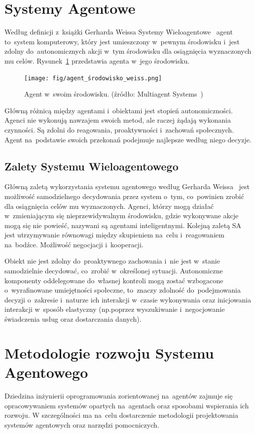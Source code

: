 \documentclass[11pt]{report}
\begin{document}
    \section{Systemy Agentowe}\label{sec:systemy-agentowe}
    Według definicji z~książki Gerharda Weissa Systemy Wieloagentowe~\cite{55066420130101} agent to~system komputerowy, który jest umieszczony w~pewnym środowisku i~jest zdolny do~autonomicznych akcji w~tym środowisku dla osiągnięcia wyznaczonych mu celów.
    Rysunek~\ref{fig:agent} przedstawia agenta w~jego środowisku.

    \begin{figure}[tp]
        \centering
        \texttt{[image: fig/agent\_środowisko\_weiss.png]}
        \caption{Agent w~swoim środowisku. (źródło: Multiagent Systems~\cite{55066420130101})}
        \label{fig:agent}
    \end{figure}

    Główną różnicą między agentami i~obiektami jest stopień autonomiczności.
    Agenci nie wykonują nawzajem swoich metod, ale raczej żądają wykonania czynności.
    Są zdolni do reagowania, proaktywności i~zachowań społecznych.
    Agent na~podstawie swoich przekonań podejmuje najlepsze według niego decyzje.

    \subsection{Zalety Systemu Wieloagentowego}
    Główną zaletą wykorzystania systemu agentowego według Gerharda Weissa~\cite{55066420130101} jest możliwość samodzielnego decydowania przez system o~tym, co~powinien zrobić dla osiągnięcia celów mu wyznaczonych.
    Agenci, którzy mogą działać w~zmieniającym się nieprzewidywalnym środowisku, gdzie wykonywane akcje mogą się nie powieść, nazywani są agentami inteligentnymi.
    Kolejną zaletą SA jest utrzymywanie równowagi między skupieniem na~celu i~reagowaniem na~bodźce.
    Możliwość negocjacji i~kooperacji.

    Obiekt nie jest zdolny do~proaktywnego zachowania i~nie jest w~stanie samodzielnie decydować, co~zrobić w~określonej sytuacji.
    Autonomiczne komponenty oddelegowane do~własnej kontroli mogą zostać wzbogacone o~wyrafinowane umiejętności społeczne, to~znaczy zdolność do~podejmowania decyzji o~zakresie i~naturze ich interakcji w~czasie wykonywania oraz inicjowania interakcji w~sposób elastyczny (np.\@ poprzez wyszukiwanie i~negocjowanie świadczenia usług oraz dostarczania danych).


    \section{Metodologie rozwoju Systemu Agentowego}\label{sec:metodologie-rozwoju-systemu-agentowego}
    Dziedzina inżynierii oprogramowania zorientowanej na~agentów zajmuje się opracowywaniem systemów opartych na~agentach oraz sposobami wspierania ich rozwoju.
    W szczególności ma na~celu dostarczenie metodologii projektowania systemów agentowych oraz narzędzi pomocniczych.
\end{document}
